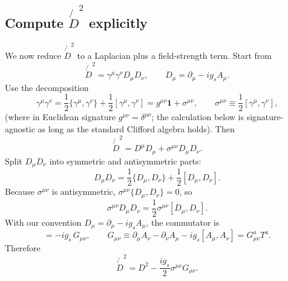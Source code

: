 \documentclass[11pt]{article}
\theoremstyle{remark}
\begin{document}
\subsection{Compute $\not{D}^2$ explicitly}
We now reduce $\not{D}^2$ to a Laplacian plus a field-strength term. Start from
\begin{equation}
\not{D}^2=\gamma^\mu\gamma^\nu D_\mu D_\nu,
\qquad D_\mu=\partial_\mu - i g_s A_\mu.
\end{equation}
Use the decomposition
\begin{equation}
\gamma^\mu\gamma^\nu=\frac12\{\gamma^\mu,\gamma^\nu\}+\frac12[\gamma^\mu,\gamma^\nu]
= g^{\mu\nu}\mathbf{1} + \sigma^{\mu\nu},
\qquad
\sigma^{\mu\nu}\equiv \frac12[\gamma^\mu,\gamma^\nu],
\end{equation}
(where in Euclidean signature $g^{\mu\nu}=\delta^{\mu\nu}$; the calculation below is signature-agnostic
as long as the standard Clifford algebra holds).
Then
\begin{equation}
\not{D}^2 = D^\mu D_\mu + \sigma^{\mu\nu}D_\mu D_\nu.
\end{equation}
Split $D_\mu D_\nu$ into symmetric and antisymmetric parts:
\begin{equation}
D_\mu D_\nu = \frac12\{D_\mu,D_\nu\}+\frac12[D_\mu,D_\nu].
\end{equation}
Because $\sigma^{\mu\nu}$ is antisymmetric, $\sigma^{\mu\nu}\{D_\mu,D_\nu\}=0$, so
\begin{equation}
\sigma^{\mu\nu}D_\mu D_\nu = \frac12\sigma^{\mu\nu}[D_\mu,D_\nu].
\end{equation}
With our convention $D_\mu=\partial_\mu-i g_s A_\mu$, the commutator is
\begin{equation}
[D_\mu,D_\nu]= -i g_s\,G_{\mu\nu},\qquad
G_{\mu\nu} \equiv \partial_\mu A_\nu-\partial_\nu A_\mu - i g_s[A_\mu,A_\nu] = G_{\mu\nu}^a T^a.
\end{equation}
Therefore
\begin{equation}\label{eq:fuj-Dslash2}
\not{D}^2 = D^2 - \frac{i g_s}{2}\sigma^{\mu\nu}G_{\mu\nu}.
\end{equation}
\end{document}
